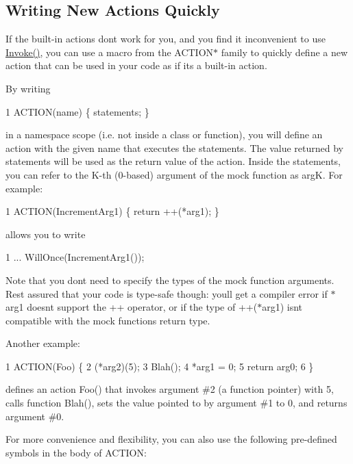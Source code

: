 \subsection*{Writing New Actions Quickly}

If the built-\/in actions don\textquotesingle{}t work for you, and you find it inconvenient to use {\ttfamily \hyperlink{namespacetesting_a12aebaf8363d49a383047529f798b694}{Invoke()}}, you can use a macro from the {\ttfamily A\+C\+T\+I\+O\+N$\ast$} family to quickly define a new action that can be used in your code as if it\textquotesingle{}s a built-\/in action.

By writing 
\begin{DoxyCode}
1 ACTION(name) \{ statements; \}
\end{DoxyCode}
 in a namespace scope (i.\+e. not inside a class or function), you will define an action with the given name that executes the statements. The value returned by {\ttfamily statements} will be used as the return value of the action. Inside the statements, you can refer to the K-\/th (0-\/based) argument of the mock function as {\ttfamily argK}. For example\+: 
\begin{DoxyCode}
1 ACTION(IncrementArg1) \{ return ++(*arg1); \}
\end{DoxyCode}
 allows you to write 
\begin{DoxyCode}
1 ... WillOnce(IncrementArg1());
\end{DoxyCode}


Note that you don\textquotesingle{}t need to specify the types of the mock function arguments. Rest assured that your code is type-\/safe though\+: you\textquotesingle{}ll get a compiler error if {\ttfamily $\ast$arg1} doesn\textquotesingle{}t support the {\ttfamily ++} operator, or if the type of {\ttfamily ++($\ast$arg1)} isn\textquotesingle{}t compatible with the mock function\textquotesingle{}s return type.

Another example\+: 
\begin{DoxyCode}
1 ACTION(Foo) \{
2   (*arg2)(5);
3   Blah();
4   *arg1 = 0;
5   return arg0;
6 \}
\end{DoxyCode}
 defines an action {\ttfamily Foo()} that invokes argument \#2 (a function pointer) with 5, calls function {\ttfamily Blah()}, sets the value pointed to by argument \#1 to 0, and returns argument \#0.

For more convenience and flexibility, you can also use the following pre-\/defined symbols in the body of {\ttfamily A\+C\+T\+I\+ON}\+:

